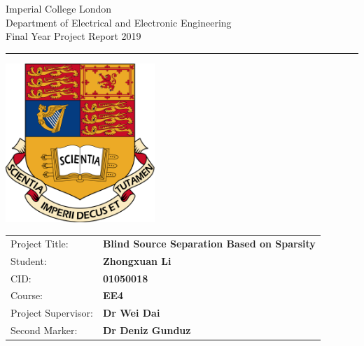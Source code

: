 \begin{titlepage}
                \setlength{\parindent}{0pt}
                \setlength{\parskip}{0pt}

                {
                                \Large
                                \raggedright
                                Imperial College London\\[17pt]
                                Department of Electrical and Electronic Engineering\\[17pt]
                                Final Year Project Report 2019\\[17pt]
 
                }

                \rule{\columnwidth}{3pt}
                \vfill
                \centering
                  \includegraphics[width=0.7\columnwidth,height=60mm,keepaspectratio]{figures/ic.png}
                \vfill
                \setlength{\tabcolsep}{0pt}

                \begin{tabular}{p{40mm}p{\dimexpr\columnwidth-40mm}}
                                Project Title: & \textbf{Blind Source Separation Based on Sparsity} \\[12pt]
                                Student: & \textbf{Zhongxuan Li} \\[12pt]
                                CID: & \textbf{01050018} \\[12pt]
                                Course: & \textbf{EE4} \\[12pt]
                                Project Supervisor: & \textbf{Dr Wei Dai} \\[12pt]
                                Second Marker: & \textbf{Dr Deniz Gunduz} \\
                \end{tabular}
\end{titlepage}